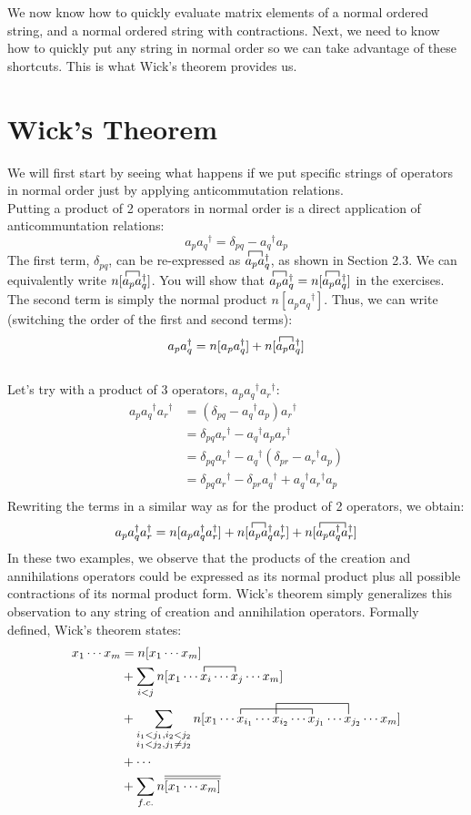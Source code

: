 \documentclass{article}
\newcommand{\ol}{\overline}
\newcommand{\dg}{\ensuremath{^\dagger} }
\newcommand{\cd}{\ensuremath{\cdots} }
\begin{document}
We now know how to quickly evaluate matrix elements of a normal ordered string, and a normal ordered string with contractions.
Next, we need to know how to quickly put any string in normal order so we can take advantage of these shortcuts. 
This is what Wick's theorem provides us. 

\section{Wick's Theorem}
We will first start by seeing what happens if we put specific strings of operators in normal order just by applying anticommutation relations.  \\ 
Putting a product of 2 operators in normal order is a direct application of anticommuntation relations: 
\[a_p a_q\dg = \delta_{pq} - a_q\dg a_p \]
The first term, $\delta_{pq}$, can be re-expressed as $\contraction{}{a}{{}_p}{a}a_p a_q\dg$, as shown in Section 2.3. 
We can equivalently write $n[\contraction{}{a}{{}_p}{a}a_p a_q\dg]$.
You will show that $\contraction{}{a}{{}_p}{a}a_p a_q\dg = n[\contraction{}{a}{{}_p}{a}a_p a_q\dg]$ in the exercises. 
The second term is simply the normal product $n[a_p a_q\dg]$. 
Thus, we can write (switching the order of the first and second terms): 
\[a_p a_q\dg = n[a_p a_q\dg] + n[\contraction{}{a}{{}_p}{a}a_p a_q\dg] \]
\\
Let's try with a product of 3 operators, $a_p a_q\dg a_r\dg$: 
\begin{align*}
a_p a_q\dg a_r\dg &= (\delta_{pq} - a_q\dg a_p)a_r\dg \\
&= \delta_{pq}a_r\dg  - a_q\dg a_p a_r\dg \\
& = \delta_{pq}a_r\dg - a_q\dg (\delta_{pr} - a_r\dg a_p)  \\
& = \delta_{pq}a_r\dg - \delta_{pr} a_q\dg +  a_q\dg a_r\dg a_p  \\
\end{align*}
Rewriting the terms in a similar way as for the product of 2 operators, we obtain:
\[a_p a_q\dg a_r\dg  = n[a_p a_q\dg a_r\dg ] + n[\contraction{}{a}{{}_p}{a} a_p a_q\dg a_r\dg ]  + n[\contraction{}{a}{{}_p a_q\dg}{a} a_p a_q\dg a_r\dg ] \]
In these two examples, we observe that the products of the creation and annihilations operators could be expressed as its normal product plus all possible contractions of its normal product form.
Wick's theorem simply generalizes this observation to any string of creation and annihilation operators. 
Formally defined, Wick's theorem states: 
\begin{align*}
x_1 \cd x_m &= n[x_1 \cd x_m ]  \\
&+ \sum_{i < j} \contraction{n[x_1 \cd}{x}{{}_i \cd }{x} n[x_1 \cd x_i \cd x_j\cd  x_m] \\
&+ \sum_{\substack{i_1 < j_1,  i_2 < j_2 \\ i_1 < j_2, j_1 \neq j_2}} 
\contraction{n[x_1 \cd}{x}{{}_{i_1} \cd x_{i_2} \cd}{x}
\contraction[2ex]{n[x_1 \cd x_{i_1} \cd }{x}{{}_{i_2} \cd x_{j_1} \cd}{x}
n[x_1 \cd x_{i_1} \cd x_{i_2} \cd x_{j_1} \cd x_{j_2} \cd x_m ]  \\
&+ \cd \\
&+ \sum_{f.c.} n \ol{\ol{[x_1 \cd x_m]  }}
\end{align*}
\end{document}

